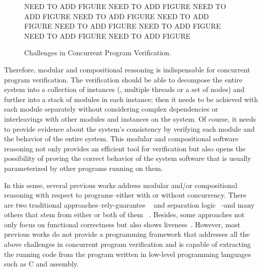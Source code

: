 \begin{figure}

NEED TO ADD FIGURE
NEED TO ADD FIGURE
NEED TO ADD FIGURE
NEED TO ADD FIGURE
NEED TO ADD FIGURE
NEED TO ADD FIGURE
NEED TO ADD FIGURE
NEED TO ADD FIGURE
NEED TO ADD FIGURE

\label{fig:intro:challenges-concurrent-prog-verification}
\caption{Challenges in Concurrent Program Verification.}
\end{figure}




Therefore, modular and compositional reasoning is indispensable for concurrent program verification. 
The verification should be able to decompose the entire system into a collection of instances (\ie, multiple threads or a set of nodes) and 
further into a stack of modules in each instance; then it needs to be achieved with each module separately without considering complex 
dependencies or interleavings with other modules and instances on the system. Of course, it needs to provide evidence about the system's 
consistency by verifying each module and the behavior of the entire system. 
This modular and compositional software reasoning not only provides an efficient tool for verification 
but also opens the possibility of proving the correct behavior of the system software that is usually parameterized by other programs running on them.
%

In this sense, several previous works address modular and/or compositional reasoning with respect to programs--either with or without concurrency.
There are two traditional approaches--rely-guarantee ~\cite{jones83} and separation logic ~\cite{ishtiaq01}-and many others 
that stem from either or both of them 
~\cite{feng07:sagl,vafeiadis:marriage,LRG,fu10:roch,sergey15, lili16,Vafeiadis11mfps, Yang07relsep,
Liang14lics}.
Besides, some approaches not only focus on functional correctness but also shows liveness~\cite{lili16}.
However, most previous works do not provide a programming framework that addresses all the above challenges
in concurrent program verification and is capable of extracting the running code from the program written in low-level programming 
languages such as C and assembly.


